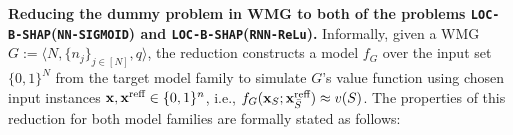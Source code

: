 

\begin{comment}
An interesting characterization of dummy players in WMGs highlighted in the following proposition. This characterization will prove useful in our reduction proof to our target problems that will be detailed:
\begin{proposition}\label{prop:characterization_dummyplayers}
      Let $G = (N,\{n_{i}\}_{i \in [N]}, q)$ be a WMG. A player $i \in [N]$ is dummy if and only if:
     \begin{equation} \label{eq:expression}
     \forall S \subseteq [N] \setminus \{i\}:~~ \sum\limits_{j \in S} n_{j}  \notin [q - n_{i}, q]
     \end{equation}
\end{proposition}
The proof of this proposition can be found in Appendix. 
\end{comment}

\textbf{Reducing the dummy problem in WMG to both of the problems \texttt{LOC-B-SHAP}(\texttt{NN-SIGMOID}) and \texttt{LOC-B-SHAP}(\texttt{RNN-ReLu}).} 
Informally, given a WMG $G := \langle N, \{n_{j}\}_{j \in [N]}, q\rangle$, the reduction constructs a model $f_{G}$ over the input set $\{0,1\}^{N}$ from the target model family to simulate $G$'s value function using chosen input instances $\textbf{x},\textbf{x}^{\text{reff}} \in \{0,1\}^{n}$, i.e., $f_{G}(\textbf{x}_{S}; \textbf{x}_{\bar{S}}^{\text{reff}}) \approx v(S)$. The properties of this reduction for both model families are formally stated as follows:


